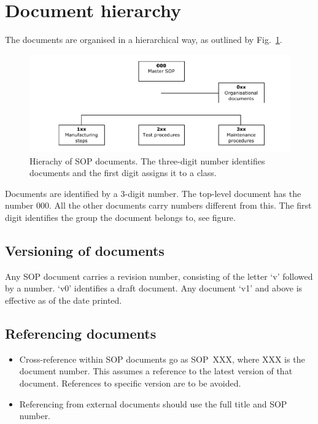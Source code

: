 \documentclass[12pt]{unlsilabsop}
\begin{document}
\section{Document hierarchy}
The documents are organised in a hierarchical way, as outlined by Fig.~\ref{fig:SOPhierarchy}.
\begin{figure}[h]
    \begin{center}
        \includegraphics[width=16cm]{img/SOPhierarchy.pdf}
        \caption{Hierachy of SOP documents. The three-digit number identifies documents and the first digit assigns it to a class.}
        \label{fig:SOPhierarchy}
    \end{center}
\end{figure}
Documents are identified by a 3-digit number. The top-level document has the number 000. All the other documents carry numbers different from this. The first digit identifies the group the document belongs to, see figure.

\subsection{Versioning of documents}
Any SOP document carries a revision number, consisting of the letter `v' followed by a number. `v0' identifies a draft document. Any document `v1' and above is effective as of the date printed.

\subsection{Referencing documents}
\begin{itemize}
\item Cross-reference within SOP documents go as SOP~XXX, where XXX is the document number. This assumes a reference to the latest version of that document. References to specific version are to be avoided.
\item Referencing from external documents should use the full title and SOP number.
\end{itemize}
\end{document}

